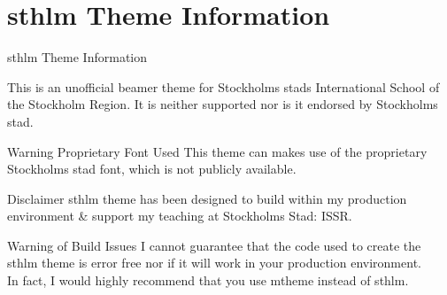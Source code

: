\documentclass[newPxFont]{beamer}
\begin{document}
%
%

\maketitle


%
%

\section*{sthlm Theme Information}


\begin{frame}[c]{sthlm Theme Information}

This is an \alert{unofficial} beamer theme for Stockholms stads International School of the Stockholm Region. It is neither supported nor is it endorsed by Stockholms stad.

\vspace{1em}

\begin{alertblock}{Warning Proprietary Font Used}
This theme can makes use of the proprietary Stockholms stad font, which is not publicly available.
\end{alertblock}

\end{frame}


\begin{frame}[c]{Disclaimer}
sthlm theme has been designed to build within my production environment \& support my teaching at Stockholms Stad: ISSR. \\

\vspace{1em}

\begin{alertblock}{Warning of Build Issues}
I cannot guarantee that the code used to create the sthlm theme is error free nor if it will work in your production environment. \\
\vspace{1em}
In fact, I would highly recommend that you use mtheme instead of sthlm.
\end{alertblock}

\end{frame}
\end{document}
